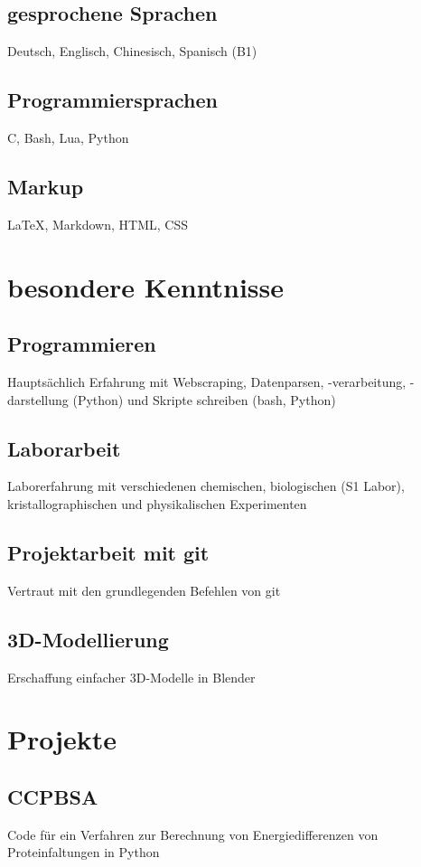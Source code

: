 \documentclass{article}
\begin{document}
\subsection{gesprochene Sprachen}
Deutsch, Englisch, Chinesisch, Spanisch (B1)

\subsection{Programmiersprachen}
C, Bash, Lua, Python

\subsection{Markup}
\LaTeX, Markdown, HTML, CSS

\section{besondere Kenntnisse}

\subsection{Programmieren}
Hauptsächlich Erfahrung mit Webscraping, Datenparsen, -verarbeitung, -darstellung (Python) und Skripte schreiben (bash, Python)

\subsection{Laborarbeit}
Laborerfahrung mit verschiedenen chemischen, biologischen (S1 Labor), kristallographischen und physikalischen Experimenten

\subsection{Projektarbeit mit git}
Vertraut mit den grundlegenden Befehlen von git

\subsection{3D-Modellierung}
Erschaffung einfacher 3D-Modelle in Blender

\section{Projekte}

\subsection{CCPBSA}
Code für ein Verfahren zur Berechnung von Energiedifferenzen von Proteinfaltungen in Python
\end{document}
